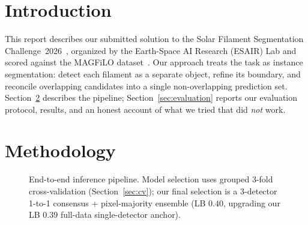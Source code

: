 \documentclass[sigconf]{acmart}
\begin{document}
\section{Introduction}
    This report describes our submitted solution to the Solar Filament Segmentation Challenge~2026~\cite{filament-segmentation-2026}, organized by the Earth-Space AI Research (ESAIR) Lab and scored against the MAGFiLO dataset~\cite{ahmadzadeh2024dataset}. Our approach treats the task as instance segmentation: detect each filament as a separate object, refine its boundary, and reconcile overlapping candidates into a single non-overlapping prediction set. Section~\ref{sec:methodology} describes the pipeline; Section~\ref{sec:evaluation} reports our evaluation protocol, results, and an honest account of what we tried that did \emph{not} work.

\section{Methodology}\label{sec:methodology}

\begin{figure}[t]
    \centering
    \caption{End-to-end inference pipeline. Model selection uses grouped 3-fold cross-validation (Section~\ref{sec:cv}); our final selection is a 3-detector 1-to-1 consensus + pixel-majority ensemble (LB $\mathbf{0.40}$, upgrading our LB $0.39$ full-data single-detector anchor).}
    \label{fig:pipeline}
\end{figure}
\end{document}
